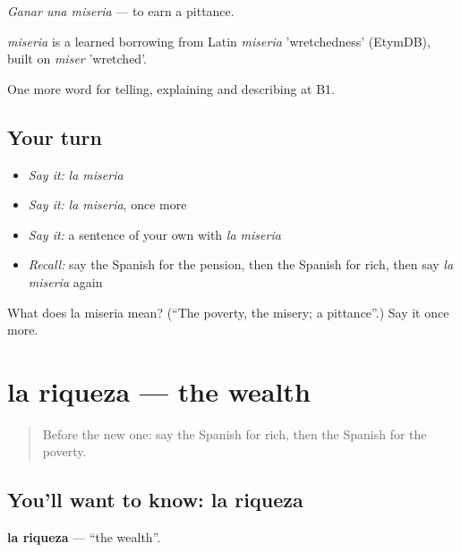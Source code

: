 \emph{Ganar una miseria} — to earn a pittance.

\begin{cousinweb}
\emph{miseria} is a learned borrowing from Latin \emph{miseria} 'wretchedness' (EtymDB), built on \emph{miser} 'wretched'.
\end{cousinweb}

\begin{grammarlens}[title={What you've built}]
One more word for telling, explaining and describing at B1.
\end{grammarlens}

\subsection*{Your turn}
\begin{itemize}
\raggedright
  \item \emph{Say it:} \emph{la miseria}
  \item \emph{Say it:} \emph{la miseria}, once more
  \item \emph{Say it:} a sentence of your own with \emph{la miseria}
  \item \emph{Recall:} say the Spanish for the pension, then the Spanish for rich, then say \emph{la miseria} again
\end{itemize}

\begin{tcolorbox}[breakable,colback=teal!4,colframe=teal!35!black,title={Before you move on}]
What does la miseria mean? (\textquotedblleft{}The poverty, the misery; a pittance\textquotedblright{}.) Say it once more.
\end{tcolorbox}
\section[la riqueza]{la riqueza — the wealth}

\label{lesson:ES-C633-riqueza}



\begin{quote}
Before the new one: say the Spanish for rich, then the Spanish for the poverty.
\end{quote}

\subsection*{You'll want to know: la riqueza}
\textbf{la riqueza} — \textquotedblleft{}the wealth\textquotedblright{}.

